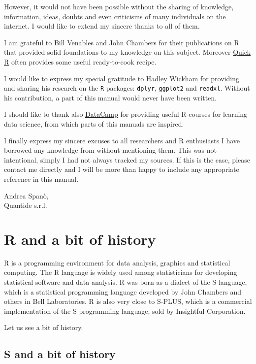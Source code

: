 \documentclass[]{book}
\begin{document}
However, it would not have been possible without the sharing of
knowledge, information, ideas, doubts and even criticisms of many
individuals on the internet. I would like to extend my sincere thanks to
all of them.

I am grateful to Bill Venables and John Chambers for their publications
on R that provided solid foundations to my knowledge on this subject.
Moreover \href{http://www.statmethods.net/}{Quick R} often provides some
useful ready-to-cook recipe.

I would like to express my special gratitude to Hadley Wickham for
providing and sharing his research on the \texttt{R} packages:
\texttt{dplyr}, \texttt{ggplot2} and \texttt{readxl}. Without his
contribution, a part of this manual would never have been written.

I should like to thank also \href{https://www.datacamp.com/}{DataCamp}
for providing useful R courses for learning data science, from which
parts of this manuals are inspired.

I finally express my sincere excuses to all researchers and R
enthusiasts I have borrowed any knowledge from without mentioning them.
This was not intentional, simply I had not always tracked my sources. If
this is the case, please contact me directly and I will be more than
happy to include any appropriate reference in this manual.

Andrea Spanò,\\
Quantide s.r.l.

\chapter{R and a bit of history}\label{r-and-a-bit-of-history}

R is a programming environment for data analysis, graphics and
statistical computing. The R language is widely used among statisticians
for developing statistical software and data analysis. R was born as a
dialect of the S language, which is a statistical programming language
developed by John Chambers and others in Bell Laboratories. R is also
very close to S-PLUS, which is a commercial implementation of the S
programming language, sold by Insightful Corporation.

Let us see a bit of history.

\section{S and a bit of history}\label{s-and-a-bit-of-history}
\end{document}

